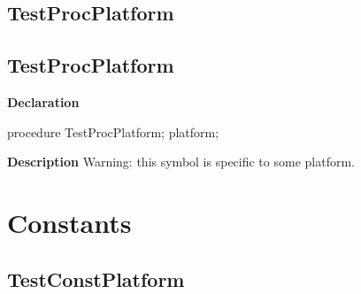 \documentclass{report}
\newif\ifpdf
\begin{document}
\subsection*{\large{\textbf{TestProcPlatform}}\normalsize\hspace{1ex}\hrulefill}
\else
\subsection*{TestProcPlatform}
\fi
\label{ok_hint_directives-TestProcPlatform}
\begin{list}{}{
\setlength{\itemindent}{0cm}
\setlength{\listparindent}{0cm}
\setlength{\leftmargin}{\evensidemargin}
\addtolength{\leftmargin}{\tmplength}
\settowidth{\labelsep}{X}
\addtolength{\leftmargin}{\labelsep}
\setlength{\labelwidth}{\tmplength}
}
\item[\textbf{Declaration}\hfill]
\ifpdf
\begin{flushleft}
\fi
\begin{ttfamily}
procedure TestProcPlatform; platform;\end{ttfamily}

\ifpdf
\end{flushleft}
\fi

\par
\item[\textbf{Description}]
Warning: this symbol is specific to some platform.

 

\end{list}
\section{Constants}
\ifpdf
\subsection*{\large{\textbf{TestConstPlatform}}\normalsize\hspace{1ex}\hrulefill}
\else
\end{document}
